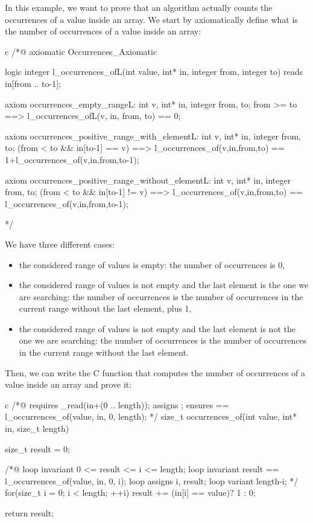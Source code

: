 \documentclass[middle]{zmdocument}
\begin{document}


In this example, we want to prove that an algorithm actually counts the
occurrences of a value inside an array. We start by axiomatically define
what is the number of occurrences of a value inside an array:



\begin{CodeBlock}{c}
/*@
  axiomatic Occurrences_Axiomatic{
    logic integer l_occurrences_of{L}(int value, int* in, integer from, integer to)
      reads in[from .. to-1];

    axiom occurrences_empty_range{L}:
      \forall int v, int* in, integer from, to;
        from >= to ==> l_occurrences_of{L}(v, in, from, to) == 0;

    axiom occurrences_positive_range_with_element{L}:
      \forall int v, int* in, integer from, to;
        (from < to && in[to-1] == v) ==>
      l_occurrences_of(v,in,from,to) == 1+l_occurrences_of(v,in,from,to-1);

    axiom occurrences_positive_range_without_element{L}:
      \forall int v, int* in, integer from, to;
        (from < to && in[to-1] != v) ==>
      l_occurrences_of(v,in,from,to) == l_occurrences_of(v,in,from,to-1);
  }
*/
\end{CodeBlock}



We have three different cases:

\begin{itemize}
\item
  the considered range of values is empty: the number of occurrences is
  0,
\item
  the considered range of values is not empty and the last element is
  the one we are searching: the number of occurrences is the number of
  occurrences in the current range without the last element, plus 1,
\item
  the considered range of values is not empty and the last element is
  not the one we are searching: the number of occurrences is the number
  of occurrences in the current range without the last element.
\end{itemize}

Then, we can write the C function that computes the number of
occurrences of a value inside an array and prove it:



\begin{CodeBlock}{c}
/*@
  requires \valid_read(in+(0 .. length));
  assigns  \nothing;
  ensures  \result == l_occurrences_of(value, in, 0, length);
*/
size_t occurrences_of(int value, int* in, size_t length){
  size_t result = 0;
  
  /*@
    loop invariant 0 <= result <= i <= length;
    loop invariant result == l_occurrences_of(value, in, 0, i);
    loop assigns i, result;
    loop variant length-i;
  */
  for(size_t i = 0; i < length; ++i)
    result += (in[i] == value)? 1 : 0;

  return result;
}
\end{CodeBlock}
\end{document}
